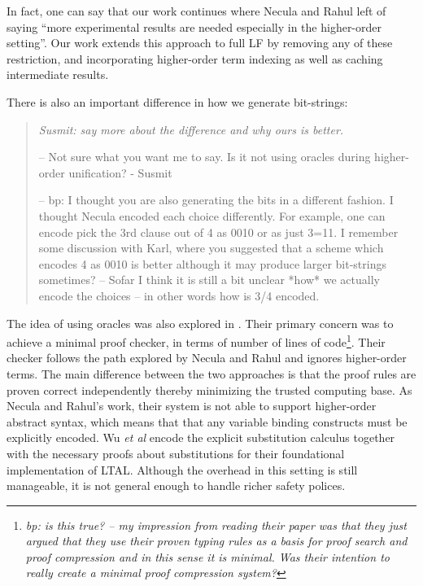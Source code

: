 \documentclass{acmconf}
\newcommand{\ednote}[1]{\footnote{\it #1}}
\newenvironment{note}{\begin{quote}\message{note!}\it}{\end{quote}}
\begin{document}
In fact, one can say that  our work continues where Necula and Rahul
left of saying ``more experimental results are needed especially in
the higher-order setting''. Our work extends this approach to full LF
by removing any of these restriction, and incorporating higher-order
term indexing as well as caching intermediate results.

There is also an important difference in how we generate bit-strings:

\begin{note}
  Susmit: say more about the difference and why ours is better.

-- Not sure what you want me to say. Is it not using oracles during
   higher-order unification? - Susmit

-- bp: I thought you are also generating the bits in a different
fashion. I thought Necula encoded each choice differently. For
example, one can encode pick the 3rd clause out of 4 as 0010
or as just 3=11. I remember some discussion with Karl, where you
suggested that a scheme which encodes 4 as 0010 is better although it
may produce larger bit-strings sometimes? -- Sofar I think it is still
a bit unclear *how* we actually encode the choices -- in other words
how is 3/4 encoded.

\end{note}

The idea of using oracles was also explored in
\cite{Appel:PPDP03}. Their primary concern was to 
achieve a minimal proof checker, in terms of number of lines of
code\ednote{bp: is this true? -- my impression from reading their
  paper was that they just argued that they use their proven typing
  rules as a basis for proof search and proof compression and in this
  sense it is minimal. Was their intention to really create a minimal
  proof compression system?}. Their checker follows the path explored
by Necula and Rahul and ignores higher-order terms. The main difference between the two
approaches is that the proof rules are proven correct
independently thereby minimizing the trusted computing base.
As Necula and Rahul's work, their system is not able to support
higher-order abstract syntax, which means that  
that any variable binding constructs must be
explicitly encoded. Wu {\em et al}\cite{Appel:PPDP03}
encode the explicit substitution calculus \cite{Abadi:POPL90} together
with the necessary proofs about substitutions for their foundational
implementation of LTAL. Although the overhead in this setting is still
manageable, it is not general enough to handle richer safety polices.
\end{document}
